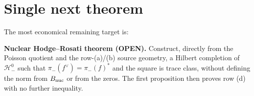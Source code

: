 \documentclass[11pt]{article}
\newcommand{\OPEN}{\textcolor{red!70!black}{\textbf{OPEN}}}
\begin{document}
\section*{Single next theorem}

The most economical remaining target is:

\medskip
\noindent\textbf{Nuclear Hodge--Rosati theorem (\OPEN).}
Construct, directly from the Poisson quotient and the row-(a)/(b) source
geometry, a Hilbert completion of $\mathcal H_-^0$ such that
$\pi_-(f^\vee)=\pi_-(f)^*$ and the square is trace class, without defining
the norm from $B_{\rm nuc}$ or from the zeros.  The first proposition then
proves row (d) with no further inequality.
\end{document}
